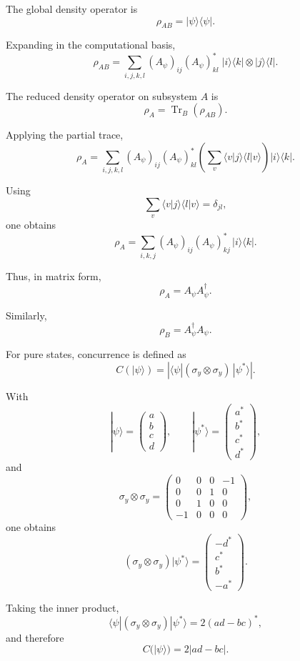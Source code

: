 \documentclass[a4paper]{article}
\begin{document}
The global density operator is
\[
\rho_{AB} = |\psi\rangle\langle\psi|.
\]

Expanding in the computational basis,
\[
\rho_{AB}
=
\sum_{i,j,k,l}
(A_\psi)_{ij}(A_\psi)^*_{kl}
\;
|i\rangle\langle k|
\otimes
|j\rangle\langle l|.
\]

The reduced density operator on subsystem \(A\) is
\[
\rho_A = \operatorname{Tr}_B(\rho_{AB}).
\]

Applying the partial trace,
\[
\rho_A
=
\sum_{i,j,k,l}
(A_\psi)_{ij}(A_\psi)^*_{kl}
\left(
\sum_v \langle v|j\rangle \langle l|v\rangle
\right)
|i\rangle\langle k|.
\]

Using
\[
\sum_v \langle v|j\rangle \langle l|v\rangle = \delta_{jl},
\]
one obtains
\[
\rho_A
=
\sum_{i,k,j}
(A_\psi)_{ij}(A_\psi)^*_{kj}
\,|i\rangle\langle k|.
\]

Thus, in matrix form,
\[
\rho_A = A_\psi A_\psi^\dagger.
\]

Similarly,
\[
\rho_B = A_\psi^\dagger A_\psi.
\]

For pure states, concurrence is defined as
\[
C(|\psi\rangle)
=
\left|
\langle \psi | (\sigma_y \otimes \sigma_y)\,|\psi^*\rangle
\right|.
\]

With
\[
|\psi\rangle =
\begin{pmatrix}
a\\ b\\ c\\ d
\end{pmatrix},
\qquad
|\psi^*\rangle =
\begin{pmatrix}
a^*\\ b^*\\ c^*\\ d^*
\end{pmatrix},
\]
and
\[
\sigma_y \otimes \sigma_y =
\begin{pmatrix}
0 & 0 & 0 & -1\\
0 & 0 & 1 & 0\\
0 & 1 & 0 & 0\\
-1 & 0 & 0 & 0
\end{pmatrix},
\]
one obtains
\[
(\sigma_y \otimes \sigma_y)|\psi^*\rangle
=
\begin{pmatrix}
- d^*\\
c^*\\
b^*\\
- a^*
\end{pmatrix}.
\]

Taking the inner product,
\[
\langle \psi | (\sigma_y \otimes \sigma_y)|\psi^*\rangle
=
2(ad - bc)^*,
\]
and therefore
\[
C(|\psi\rangle)=2|ad-bc|.
\]
\end{document}

